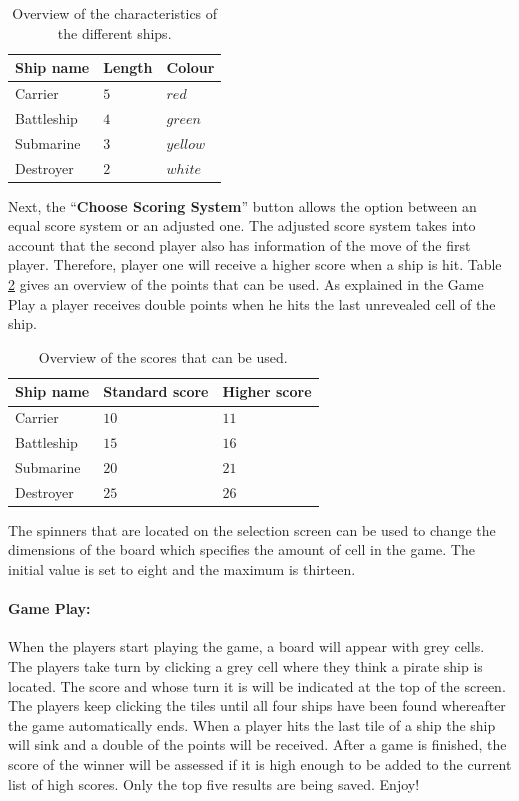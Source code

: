 \documentclass[a4paper,10pt]{article}
\begin{document}
\begin{table}[h!]
	\centering
	\begin{tabular}{|p{3cm}|p{2cm}|p{2cm}|}
		\hline
		\textbf{Ship name} & \textbf{Length} & \textbf{Colour}\\ \hline
		Carrier  & $ 5 $ & $ red $\\ \hline
		Battleship  & $ 4 $ & $ green $\\ \hline
		Submarine  & $ 3 $ & $ yellow $\\ \hline
		Destroyer  & $ 2 $ & $ white $\\ \hline
	\end{tabular}
	\caption{Overview of the characteristics of the different ships.}
	\label{t:layoutTextFile}
\end{table}

Next, the ``\textbf{Choose Scoring System}'' button allows the option between an equal score system or an adjusted one. The adjusted score system takes into account that the second player also has information of the move of the first player. Therefore, player one will receive a higher score when a ship is hit. Table \ref{t:scores} gives an overview of the points that can be used. As explained in the Game Play a player receives double points when he hits the last unrevealed cell of the ship.

\begin{table}[h!]
	\centering
	\begin{tabular}{|p{3cm}|p{3cm}|p{3cm}|}
		\hline
		\textbf{Ship name} & \textbf{Standard score} & \textbf{Higher score}\\ \hline
		Carrier  & $ 10 $ & $ 11 $\\ \hline
		Battleship  & $ 15 $ & $ 16 $\\ \hline
		Submarine  & $ 20 $ & $ 21 $\\ \hline
		Destroyer  & $ 25 $ & $ 26 $\\ \hline
	\end{tabular}
	\caption{Overview of the scores that can be used.}
	\label{t:scores}
\end{table}

The spinners that are located on the selection screen can be used to change the dimensions of the board which specifies the amount of cell in the game. The initial value is set to eight and the maximum is thirteen.

\paragraph{Game Play:}\label{s:Gameplay}
When the players start playing the game, a board will appear with grey cells. The players take turn by clicking a grey cell where they think a pirate ship is located. The score and whose turn it is will be indicated at the top of the screen. The players keep clicking the tiles until all four ships have been found whereafter the game automatically ends. When a player hits the last tile of a ship the ship will sink and a double of the points will be received. After a game is finished, the score of the winner will be assessed if it is high enough to be added to the current list of high scores. Only the top five results are being saved. Enjoy! 
\end{document}
